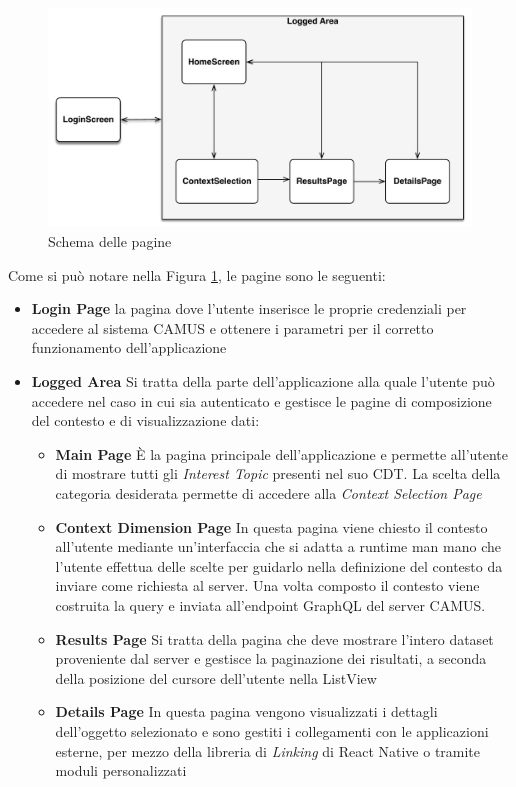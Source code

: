 \begin{figure}[H]
	\centering
	\includegraphics[width=\textwidth]{4-progettazione-alto-livello/Immagini/screen_schema.pdf}
	\caption{Schema delle pagine}\label{fig:screen-schema}
\end{figure}

Come si può notare nella Figura \ref{fig:screen-schema}, le pagine sono le seguenti:

\begin{itemize}
	\item \textbf{Login Page}
	\upe la pagina dove l'utente inserisce le proprie credenziali per accedere al sistema CAMUS e ottenere i parametri per il corretto funzionamento dell'applicazione
	\item \textbf{Logged Area}
	Si tratta della parte dell'applicazione alla quale l'utente può accedere nel caso in cui sia autenticato e gestisce le pagine di composizione del contesto e di visualizzazione dati:
	\begin{itemize}
		\item \textbf{Main Page}
		È la pagina principale dell'applicazione e permette all'utente di mostrare tutti gli \emph{Interest Topic} presenti nel suo CDT. La scelta della categoria desiderata permette di accedere alla \emph{Context Selection Page}
		\item \textbf{Context Dimension Page}
		In questa pagina viene chiesto il contesto all'utente mediante un'interfaccia che si adatta a runtime man mano che l'utente effettua delle scelte per guidarlo nella definizione del contesto da inviare come richiesta al server. Una volta composto il contesto viene costruita la query e inviata all'endpoint GraphQL del server CAMUS. 
		\item \textbf{Results Page}
		Si tratta della pagina che deve mostrare l'intero dataset proveniente dal server e gestisce la paginazione dei risultati, a seconda della posizione del cursore dell'utente nella ListView 
		\item \textbf{Details Page}
		In questa pagina vengono visualizzati i dettagli dell'oggetto selezionato e sono gestiti i collegamenti con le applicazioni esterne, per mezzo della libreria di \emph{Linking} di React Native o tramite moduli personalizzati
	\end{itemize}
\end{itemize}

